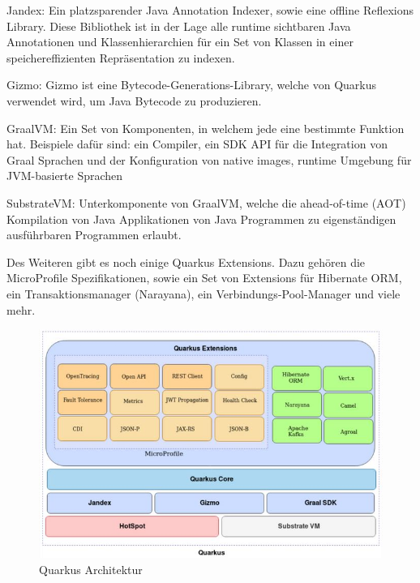 \begin{compactitem}
    \item Jandex: Ein platzsparender Java Annotation Indexer, sowie eine offline Reflexions Library. Diese Bibliothek ist in der Lage alle runtime sichtbaren Java Annotationen und Klassenhierarchien für ein Set von Klassen in einer speichereffizienten Repräsentation zu indexen.    
    \item Gizmo: Gizmo ist eine Bytecode-Generations-Library, welche von Quarkus verwendet wird, um Java Bytecode zu produzieren.             
    \item GraalVM: Ein Set von Komponenten, in welchem jede eine bestimmte Funktion hat. Beispiele dafür sind: ein Compiler, ein SDK API für die Integration von Graal Sprachen und der Konfiguration von native images, runtime Umgebung für JVM-basierte Sprachen
    \item SubstrateVM: Unterkomponente von GraalVM, welche die ahead-of-time (AOT) Kompilation von Java Applikationen von Java Programmen zu eigenständigen ausführbaren Programmen erlaubt.
\end{compactitem}
 
Des Weiteren gibt es noch einige Quarkus Extensions. Dazu gehören die MicroProfile Spezifikationen, sowie ein Set von Extensions für Hibernate ORM, ein Transaktionsmanager (Narayana), ein Verbindungs-Pool-Manager und viele mehr. \cite{QuarkusBuch}
 
\begin{figure}
    \centering
    \includegraphics[scale=0.9]{pics/quarkusArchitektur.JPG}
    \caption{Quarkus Architektur \cite{QuarkusBuch}}
    \label{fig:impl:QuarkusArchitektur}
\end{figure}
 
